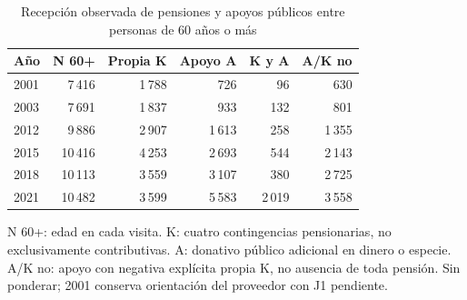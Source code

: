 \begin{table}[!htbp]
\centering
\caption{Recepción observada de pensiones y apoyos públicos entre personas de 60 años o más}\label{tab:proteccion-cobertura}
\small\setlength{\tabcolsep}{4pt}
\renewcommand{\arraystretch}{1.15}
\begin{tabular}{lrrrrr}
\toprule
\textbf{Año} & \textbf{N 60+} & \textbf{Propia K} & \textbf{Apoyo A} & \textbf{K y A} & \textbf{A/K no} \\
\midrule
2001 & 7\,416 & 1\,788 & 726 & 96 & 630 \\
2003 & 7\,691 & 1\,837 & 933 & 132 & 801 \\
2012 & 9\,886 & 2\,907 & 1\,613 & 258 & 1\,355 \\
2015 & 10\,416 & 4\,253 & 2\,693 & 544 & 2\,143 \\
2018 & 10\,113 & 3\,559 & 3\,107 & 380 & 2\,725 \\
2021 & 10\,482 & 3\,599 & 5\,583 & 2\,019 & 3\,558 \\
\bottomrule
\end{tabular}
\par\medskip
\parbox{\linewidth}{\footnotesize N 60+: edad en cada visita. K: cuatro contingencias pensionarias, no exclusivamente contributivas. A: donativo público adicional en dinero o especie. A/K no: apoyo con negativa explícita propia K, no ausencia de toda pensión. Sin ponderar; 2001 conserva orientación del proveedor con J1 pendiente.}
\end{table}
